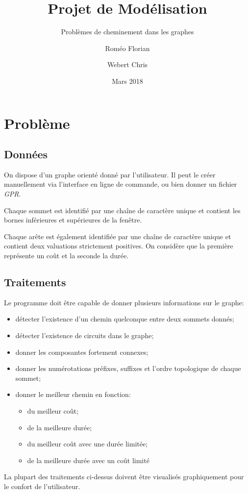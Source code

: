 \documentclass{scrreprt}
\title{\textbf{Projet de Modélisation}}
\subtitle{Problèmes de cheminement dans les graphes}
\date{Mars 2018}
\author{Roméo Florian \and Webert Chris}
\begin{document}
	{\small\maketitle}
	\tableofcontents
	\chapter{Problème}
	\section{Données}
	On dispose d'un graphe orienté donné par l'utilisateur. Il peut le créer manuellement via l'interface en ligne de commande, ou bien donner un fichier \textit{GPR}.
	
	Chaque sommet est identifié par une chaîne de caractère unique et contient les bornes inférieures et supérieures de la fenêtre.
	
	Chaque arête est également identifiée par une chaîne de caractère unique et contient deux valuations strictement positives. 
	On considère que la première représente un coût et la seconde la durée.
	
	\section{Traitements}
	Le programme doit être capable de donner plusieurs informations sur le graphe:
	\begin{itemize}
		\item détecter l'existence d'un chemin quelconque entre deux sommets donnés;
		\item détecter l'existence de circuits dans le graphe;
		\item donner les composantes fortement connexes;
		\item donner les numérotations préfixes, suffixes et l'ordre topologique de chaque sommet;
		\item donner le meilleur chemin en fonction:
		\begin{itemize}
			\item du meilleur coût;
			\item de la meilleure durée;
			\item du meilleur coût avec une durée limitée;
			\item de la meilleure durée avec un coût limité
		\end{itemize}
	\end{itemize}

	La plupart des traitements ci-dessus doivent être visualisés graphiquement pour le confort de l'utilisateur.
	
\end{document}
